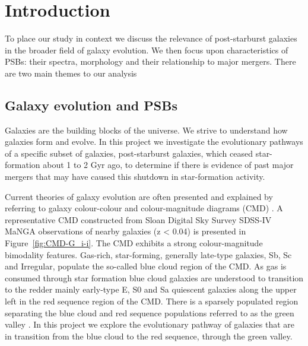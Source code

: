 \section{Introduction}
\label{sec:introduction}
To place our study in context we discuss the relevance of post-starburst galaxies in the broader field of galaxy evolution. We then focus upon characteristics of PSBs: their spectra, morphology and their relationship to major mergers. There are two main themes to our analysis 

\subsection{Galaxy evolution and PSBs}
\label{sec:evolution}
Galaxies are the building blocks of the universe. We strive to understand how galaxies form and evolve. In this project we investigate the evolutionary pathways of a specific subset of galaxies, post-starburst galaxies, which ceased star-formation about 1 to 2 Gyr ago, to determine if there is evidence of past major mergers that may have caused this  shutdown in star-formation activity.

Current theories of galaxy evolution are often presented and explained  by referring to galaxy colour-colour and colour-magnitude diagrams (CMD) \citep[see e.g.][]{2001AJ....122.1861S, 2003ApJ...585L...5H, 2003ApJS..149..289B,baldry2004quantifying,2006MNRAS.373..469B}. A representative CMD constructed from Sloan Digital Sky Survey SDSS-IV MaNGA observations of nearby galaxies (z < 0.04) is presented in  Figure~\ref{fig:CMD-G_i-i}. The CMD exhibits a strong colour-magnitude bimodality features.  Gas-rich, star-forming, generally late-type galaxies, Sb, Sc and Irregular, populate the so-called blue cloud region of the CMD. As gas is consumed through star formation blue cloud galaxies are understood to transition to the redder mainly early-type E, S0 and Sa quiescent galaxies along the upper left in the red sequence region of the CMD. There is a sparsely populated region separating the blue cloud and red sequence populations referred to as the green valley \citep{2004ApJ...608..752B}. In this project we explore the evolutionary pathway of galaxies that are in transition from the blue cloud to the red sequence, through the green valley.

